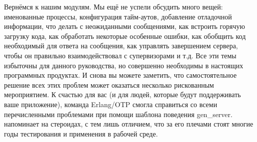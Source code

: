 Вернёмся к нашим модулям.
Мы ещё не успели обсудить много вещей: именованные процессы, конфигурация тайм\--аутов, добавление отладочной информации, что делать с неожиданными сообщениями, как встроить горячую загрузку кода, как обработать некоторые особенные ошибки, как обобщить код необходимый для ответа на сообщения, как управлять завершением сервера, чтобы он правильно взаимодействовал с супервизорами и т.д.
Все эти темы избыточны для данного руководства, но совершенно необходимы в настоящих программных продуктах.
И снова вы можете заметить, что самостоятельное решение всех этих проблем может оказаться несколько рискованным мероприятием.
К счастью для вас (и для людей, которые будут поддерживать ваше приложение), команда Erlang/OTP смогла справиться со всеми перечисленными проблемами при помощи шаблона поведения gen\_server.
 напоминает  на стероидах, с тем лишь отличием, что за его плечами стоят многие годы тестирования и применения в рабочей среде.
